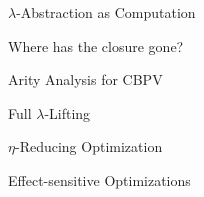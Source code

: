 \documentclass[letterpaper,10pt,aspectratio=169,dvipsnames]{beamer}
\begin{document}
\begin{frame}{\(\lambda\)-Abstraction as Computation}
\end{frame}

\begin{frame}{Where has the closure gone?}
\end{frame}

\begin{frame}{Arity Analysis for CBPV}
\end{frame}

\begin{frame}{Full \(\lambda\)-Lifting}
\end{frame}

\begin{frame}{\(\eta\)-Reducing Optimization}
\end{frame}

\begin{frame}{Effect-sensitive Optimizations}
\end{frame}
\end{document}
